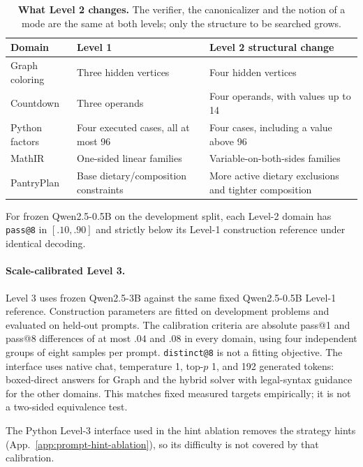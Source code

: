 \documentclass{article}
\makeatletter
\newcommand{\1}{\mathbf 1}
\newcommand{\distk}{\texttt{distinct@8}}
\theoremstyle{remark}
\theoremstyle{definition}
\theoremstyle{plain}
\makeatother
\begin{document}
\begin{table}[!htbp]
\centering
\caption{\textbf{What Level 2 changes.} The verifier, the canonicalizer and the
notion of a mode are the same at both levels; only the structure to be searched
grows.}
\label{tab:level2-structure}
\small
\begin{tabularx}{.96\linewidth}{@{}lYY@{}}
\toprule
\textbf{Domain} & \textbf{Level 1} & \textbf{Level 2 structural change} \\
\midrule
Graph coloring & Three hidden vertices & Four hidden vertices \\
Countdown & Three operands & Four operands, with values up to 14 \\
Python factors & Four executed cases, all at most 96 & Four cases, including a value above 96 \\
MathIR & One-sided linear families & Variable-on-both-sides families \\
PantryPlan & Base dietary/composition constraints & More active dietary exclusions and tighter composition \\
\bottomrule
\end{tabularx}
\end{table}

For frozen Qwen2.5-0.5B on the development split, each Level-2 domain has
\texttt{pass@8} in $[.10,.90]$ and strictly below its Level-1 construction
reference under identical decoding.

\paragraph{Scale-calibrated Level 3.}
Level 3 uses frozen Qwen2.5-3B against the same fixed Qwen2.5-0.5B Level-1
reference. Construction parameters are fitted on development problems and evaluated on
held-out prompts. The calibration criteria are absolute pass@1 and pass@8
differences of at most $.04$ and $.08$ in every domain, using four independent
groups of eight samples per prompt. \distk{} is not a fitting objective. The
interface uses native chat, temperature 1, top-$p$ 1, and 192 generated
tokens: boxed-direct answers for Graph and the hybrid solver with
legal-syntax guidance for the other domains. This matches fixed measured
targets empirically; it is not a two-sided equivalence test.

The Python Level-3 interface used in the hint ablation removes the strategy
hints (App.~\ref{app:prompt-hint-ablation}), so its difficulty is not
covered by that calibration.
\end{document}
